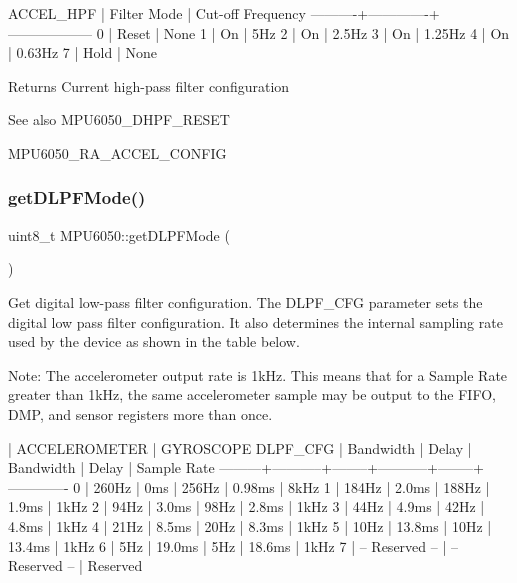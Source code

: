 \begin{DoxyPre}
ACCEL\_HPF | Filter Mode | Cut-off Frequency
----------+-------------+------------------
0         | Reset       | None
1         | On          | 5Hz
2         | On          | 2.5Hz
3         | On          | 1.25Hz
4         | On          | 0.63Hz
7         | Hold        | None
\end{DoxyPre}


\begin{DoxyReturn}{Returns}
Current high-\/pass filter configuration 
\end{DoxyReturn}
\begin{DoxySeeAlso}{See also}
M\+P\+U6050\+\_\+\+D\+H\+P\+F\+\_\+\+R\+E\+S\+ET 

M\+P\+U6050\+\_\+\+R\+A\+\_\+\+A\+C\+C\+E\+L\+\_\+\+C\+O\+N\+F\+IG 
\end{DoxySeeAlso}
\mbox{\label{class_m_p_u6050_a9f2737fe22955fd85b2575ba8da874c6}} 
\subsubsection{\texorpdfstring{getDLPFMode()}{getDLPFMode()}}
{\footnotesize\ttfamily uint8\+\_\+t M\+P\+U6050\+::get\+D\+L\+P\+F\+Mode (\begin{DoxyParamCaption}{ }\end{DoxyParamCaption})}

Get digital low-\/pass filter configuration. The D\+L\+P\+F\+\_\+\+C\+FG parameter sets the digital low pass filter configuration. It also determines the internal sampling rate used by the device as shown in the table below.

Note\+: The accelerometer output rate is 1k\+Hz. This means that for a Sample Rate greater than 1k\+Hz, the same accelerometer sample may be output to the F\+I\+FO, D\+MP, and sensor registers more than once.


\begin{DoxyPre}
         |   ACCELEROMETER    |           GYROSCOPE
DLPF\_CFG | Bandwidth | Delay  | Bandwidth | Delay  | Sample Rate
---------+-----------+--------+-----------+--------+-------------
0        | 260Hz     | 0ms    | 256Hz     | 0.98ms | 8kHz
1        | 184Hz     | 2.0ms  | 188Hz     | 1.9ms  | 1kHz
2        | 94Hz      | 3.0ms  | 98Hz      | 2.8ms  | 1kHz
3        | 44Hz      | 4.9ms  | 42Hz      | 4.8ms  | 1kHz
4        | 21Hz      | 8.5ms  | 20Hz      | 8.3ms  | 1kHz
5        | 10Hz      | 13.8ms | 10Hz      | 13.4ms | 1kHz
6        | 5Hz       | 19.0ms | 5Hz       | 18.6ms | 1kHz
7        |   -- Reserved --   |   -- Reserved --   | Reserved
\end{DoxyPre}


